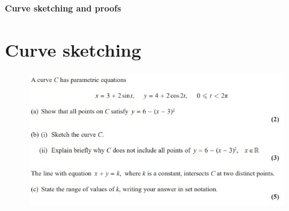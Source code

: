 \documentclass[12pt]{article}
\begin{document}
    {\Huge \textbf{Curve sketching and proofs} \par}

    \section*{Curve sketching}
    \begin{figure}[h]
        \includegraphics[width = \linewidth]{Curve1.jpg}
    \end{figure}

    
\end{document}
